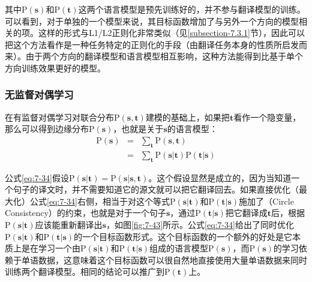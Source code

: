 \parinterval 其中$\textrm{P}(\mathbf s)$和$\textrm{P}(\mathbf t)$这两个语言模型是预先训练好的，并不参与翻译模型的训练。可以看到，对于单独的一个模型来说，其目标函数增加了与另外一个方向的模型相关的项。这样的形式与L1/L2正则化非常类似（见\ref{subsection-7.3.1}节），因此可以把这个方法看作是一种任务特定的正则化的手段（由翻译任务本身的性质所启发而来）。由于两个方向的翻译模型和语言模型相互影响，这种方法能得到比基于单个方向训练效果更好的模型。


\subsubsection{无监督对偶学习}

\parinterval 在有监督对偶学习对联合分布$\textrm{P}(\mathbf s,\mathbf t)$建模的基础上，如果把$\mathbf  t$看作一个隐变量，那么可以得到边缘分布$\textrm{P}(\mathbf s)$，也就是关于$\mathbf s$的语言模型：
\begin{eqnarray}
\textrm{P}(\mathbf s) &=& \sum_{\mathbf t}\textrm{P}(\mathbf s,\mathbf t) \nonumber \\
&=& \sum_{\mathbf t}\textrm{P}(\mathbf s|\mathbf t)\textrm{P}(\mathbf t|\mathbf s)
\label{eq:7-34}
\end{eqnarray}

\noindent  公式\ref{eq:7-34}假设$\textrm{P}(\mathbf s|\mathbf t)=\textrm{P}(\mathbf s|\mathbf s,\mathbf t)$。这个假设显然是成立的，因为当知道一个句子的译文时，并不需要知道它的源文就可以把它翻译回去。如果直接优化（最大化）公式\ref{eq:7-34}右侧，相当于对这个等式$\textrm{P}(\mathbf s|\mathbf t)$和$\textrm{P}(\mathbf t|\mathbf s)$施加了{\small{}}（Circle Consistency）的约束\cite{DBLP:conf/iccv/ZhuPIE17}，也就是对于一个句子$\mathbf s$，通过$\textrm{P}(\mathbf t|\mathbf s)$把它翻译成$\mathbf t$后，根据$\textrm{P}(\mathbf s|\mathbf t)$应该能重新翻译出$\mathbf s$，如图\ref{fig:7-43}所示。公式\ref{eq:7-34}给出了同时优化$\textrm{P}(\mathbf s|\mathbf t)$和$\textrm{P}(\mathbf t|\mathbf s)$的一个目标函数形式。这个目标函数的一个额外的好处是它本质上是在学习一个由$\textrm{P}(\mathbf s|\mathbf t)$和$\textrm{P}(\mathbf t|\mathbf s)$组成的语言模型$\textrm{P}(\mathbf s)$，而$\textrm{P}(\mathbf s)$的学习依赖于单语数据，这意味着这个目标函数可以很自然地直接使用大量单语数据来同时训练两个翻译模型。相同的结论可以推广到$\textrm{P}(\mathbf t)$上\cite{DBLP:conf/nips/HeXQWYLM16}。


